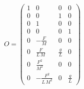 \begin{equation}
O = \left(\begin{array}{cccc} 1 & 0 & 0 & 0\\ 0 & 0 & 1 & 0\\ 0 & 1 & 0 & 0\\ 0 & 0 & 0 & 1\\ 0 & -\frac{F}{M} & 0 & 0\\ 0 & \frac{F}{L\,M} & \frac{g}{L} & 0\\ 0 & \frac{F^2}{M^2} & 0 & 0\\ 0 & -\frac{F^2}{L\,M^2} & 0 & \frac{g}{L} \end{array}\right)
\end{equation}
